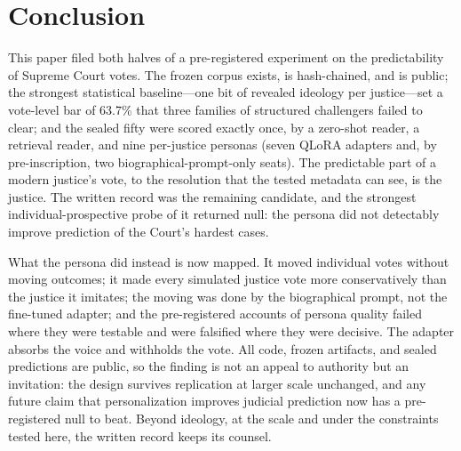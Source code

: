 \section{Conclusion}\label{sec:conclusion}

This paper filed both halves of a pre-registered experiment on the
predictability of Supreme Court votes. The frozen corpus exists, is
hash-chained, and is public; the strongest statistical baseline---one
bit of revealed ideology per justice---set a vote-level bar of 63.7\%
that three families of structured challengers failed to clear; and the
sealed fifty were scored exactly once, by a zero-shot reader, a
retrieval reader, and nine per-justice personas (seven QLoRA adapters
and, by pre-inscription, two biographical-prompt-only seats). The
predictable part of a modern justice's vote, to the resolution that
the tested metadata can see, is the justice. The written record was
the remaining candidate, and the strongest individual-prospective
probe of it returned null: the persona did not detectably improve
prediction of the Court's hardest cases.

What the persona did instead is now mapped. It moved individual votes
without moving outcomes; it made every simulated justice vote more
conservatively than the justice it imitates; the moving was done by
the biographical prompt, not the fine-tuned adapter; and the
pre-registered accounts of persona quality failed where they were
testable and were falsified where they were decisive. The adapter
absorbs the voice and withholds the vote. All code, frozen artifacts,
and sealed predictions are public, so the finding is not an appeal to
authority but an invitation: the design survives replication at
larger scale unchanged, and any future claim that personalization
improves judicial prediction now has a pre-registered null to beat.
Beyond ideology, at the scale and under the constraints tested here,
the written record keeps its counsel.
